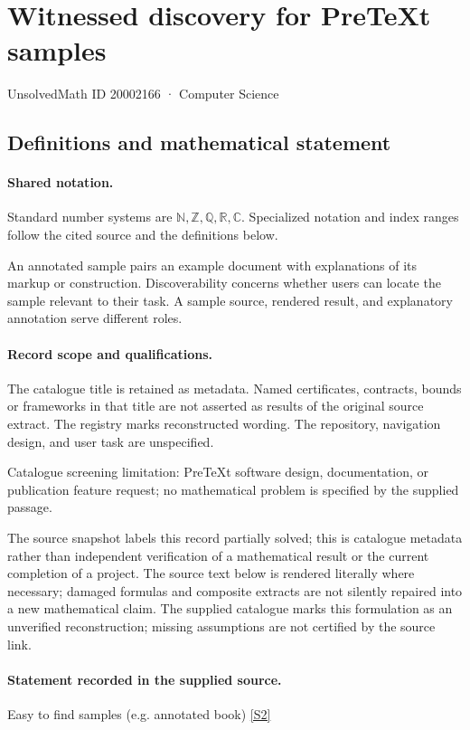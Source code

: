 \documentclass[11pt]{article}
\newcommand{\sref}[2]{\hyperlink{source:#1:#2}{[S#2]}}
\begin{document}
\setcounter{section}{20002165}
\section{Witnessed discovery for PreTeXt samples}\label{20002166}
{\small\sffamily UnsolvedMath ID 20002166 · Computer Science}
\subsection{Definitions and mathematical statement}

\paragraph{Shared notation.}Standard number systems are $\mathbb N,\mathbb Z,\mathbb Q,\mathbb R,\mathbb C$. Specialized notation and index ranges follow the cited source and the definitions below.


An annotated sample pairs an example document with explanations of its markup or construction. Discoverability concerns whether users can locate the sample relevant to their task. A sample source, rendered result, and explanatory annotation serve different roles.
\paragraph{Record scope and qualifications.}
The catalogue title is retained as metadata. Named certificates, contracts, bounds or frameworks in that title are not asserted as results of the original source extract.
The registry marks reconstructed wording. The repository, navigation design, and user task are unspecified.

Catalogue screening limitation: PreTeXt software design, documentation, or publication feature request; no mathematical problem is specified by the supplied passage.

The source snapshot labels this record partially solved; this is catalogue metadata rather than independent verification of a mathematical result or the current completion of a project.
The source text below is rendered literally where necessary; damaged formulas and composite extracts are not silently repaired into a new mathematical claim.
The supplied catalogue marks this formulation as an unverified reconstruction; missing assumptions are not certified by the source link.
\paragraph{Statement recorded in the supplied source.}
Easy to find samples (e.g. annotated book) \sref{20002166}{2}
\end{document}
